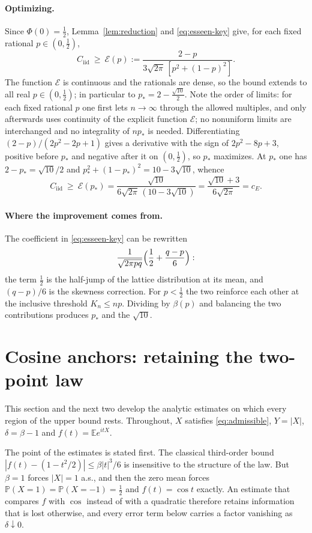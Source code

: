 \documentclass[10pt,a4paper]{article}
\theoremstyle{plain}
\theoremstyle{definition}
\newcommand{\E}{\mathbb{E}}
\newcommand{\PR}{\mathbb{P}}
\newcommand{\Cii}{C_{\mathrm{iid}}}
\begin{document}
\paragraph{Optimizing.}
Since $\Phi(0)=\tfrac12$, Lemma~\ref{lem:reduction} and
\eqref{eq:esseen-key} give, for each fixed rational $p\in(0,\tfrac12)$,
\[
  \Cii \ \ge\ \mathcal E(p) := \frac{2-p}{3\sqrt{2\pi}\,[p^2+(1-p)^2]} .
\]
The function $\mathcal E$ is continuous and the rationals are dense, so the
bound extends to all real $p\in(0,\tfrac12)$; in particular to
$p_*=2-\tfrac{\sqrt{10}}{2}$. Note the order of limits: for each fixed
rational $p$ one first lets $n\to\infty$ through the allowed multiples, and only
afterwards uses continuity of the explicit function $\mathcal E$; no
nonuniform limits are interchanged and no integrality of $np_*$ is needed.
Differentiating $(2-p)/(2p^2-2p+1)$ gives a derivative with the sign of
$2p^2-8p+3$, positive before $p_*$ and negative after it on $(0,\tfrac12)$, so
$p_*$ maximizes. At $p_*$ one has $2-p_*=\sqrt{10}/2$ and
$p_*^2+(1-p_*)^2=10-3\sqrt{10}$, whence
\[
  \Cii \ \ge\ \mathcal E(p_*)
  = \frac{\sqrt{10}}{6\sqrt{2\pi}\,(10-3\sqrt{10})}
  = \frac{\sqrt{10}+3}{6\sqrt{2\pi}} = c_E .
\]

\paragraph{Where the improvement comes from.}
The coefficient in \eqref{eq:esseen-key} can be rewritten
\[
  \frac1{\sqrt{2\pi pq}}\Bigl(\frac12 + \frac{q-p}{6}\Bigr):
\]
the term $\tfrac12$ is the half-jump of the lattice distribution at its mean,
and $(q-p)/6$ is the skewness correction. For $p<\tfrac12$ the two reinforce
each other at the inclusive threshold $K_n\le np$. Dividing by $\beta(p)$ and
balancing the two contributions produces $p_*$ and the $\sqrt{10}$.

\section{Cosine anchors: retaining the two-point law}
\label{sec:anchors}

This section and the next two develop the analytic estimates on which every
region of the upper bound rests. Throughout, $X$ satisfies
\eqref{eq:admissible}, $Y=|X|$, $\delta=\beta-1$ and $f(t)=\E e^{itX}$.

The point of the estimates is stated first. The classical third-order bound
$|f(t)-(1-t^2/2)|\le\beta|t|^3/6$ is insensitive to the structure of the law.
But $\beta=1$ forces $|X|=1$ a.s., and then the zero mean forces
$\PR(X=1)=\PR(X=-1)=\tfrac12$ and $f(t)=\cos t$ exactly. An estimate that
compares $f$ with $\cos$ instead of with a quadratic therefore retains
information that is lost otherwise, and every error term below carries a factor
vanishing as $\delta\downarrow0$.
\end{document}
